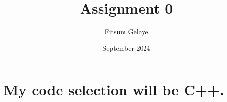 \documentclass{article}
\title{Assignment 0}
\author{Fitsum Gelaye }
\date{September 2024}
\begin{document}
\maketitle

\section{My code selection will be C++. }
\end{document}
